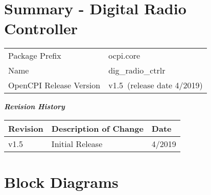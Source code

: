\documentclass{article}
\author{} %
\date{Version \docVersion} %
\title{\docTitle}
\def\docVersion{1.5}
\def\comp{dig\_radio\_ctrlr}
\def\Comp{Digital Radio Controller}
\begin{document}
\section*{Summary - \Comp}
\begin{longtable}{|p{}
                  |p{}|}
	\hline
	\rowcolor{blue}
	                  &                                        \\
	\hline
	Package Prefix    & ocpi.core \\
	\hline
	Name              & \comp                                  \\
	\hline
	OpenCPI Release Version & v\docVersion ~(release date 4/2019) \\
	\hline
\end{longtable}

\begin{center}
  \textit{\textbf{Revision History}}
  \begin{longtable}{|p{}
                    |p{}
                    |p{}|}
    \hline
    \rowcolor{blue}
    \textbf{Revision} & \textbf{Description of Change} & \textbf{Date} \\
    \hline
    v1.5 & Initial Release & 4/2019 \\
    \hline
  \end{longtable}
\end{center}

\section{Block Diagrams}
\end{document}
